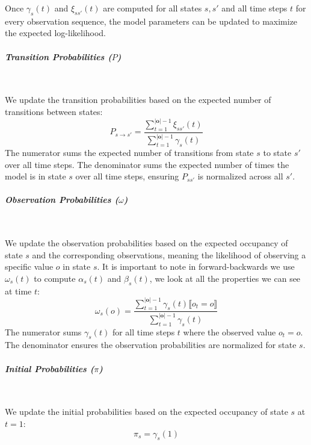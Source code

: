 Once $\gamma_s(t)$ and $\xi_{ss'}(t)$ are computed for all states $s, s'$ and all time steps $t$ for every observation sequence, the model parameters can be updated to maximize the expected log-likelihood.

\paragraph*{\textit{Transition Probabilities ($P$)}} \

We update the transition probabilities based on the expected number of transitions between states:
\begin{equation}
    P_{s \rightarrow s'} = \frac{\sum_{t = 1}^{|\mathbf{o}|-1} \xi_{ss'}(t)}{\sum_{t = 1}^{|\mathbf{o}|-1} \gamma_s(t)}
    \label{eq:equation18}
\end{equation}
The numerator sums the expected number of transitions from state $s$ to state $s'$ over all time steps. The denominator sums the expected number of times the model is in state $s$ over all time steps, ensuring $P_{ss'}$ is normalized across all $s'$.

\paragraph*{\textit{Observation Probabilities ($\omega$)}} \

We update the observation probabilities based on the expected occupancy of state $s$ and the corresponding observations, meaning the likelihood of observing a specific value $o$ in state $s$. It is important to note in forward-backwards we use $\omega_s(t)$ to compute $\alpha_s(t)$ and $\beta_s(t)$, we look at all the properties we can see at time $t$:
\begin{equation}
    \omega_s(o) = \frac{\sum_{t = 1}^{|\mathbf{o}|-1} \gamma_s(t) \llbracket o_t = o \rrbracket}{\sum_{t = 1}^{|\mathbf{o}|-1} \gamma_s(t)}
    \label{eq:equation19}
\end{equation}
The numerator sums $\gamma_s(t)$ for all time steps $t$ where the observed value $o_t = o$. The denominator ensures the observation probabilities are normalized for state $s$.
\paragraph*{\textit{Initial Probabilities ($\pi$)}} \

We update the initial probabilities based on the expected occupancy of state $s$ at $t = 1$:
\begin{equation}
    \pi_s = \gamma_s(1)
    \label{eq:equation20}
\end{equation}

